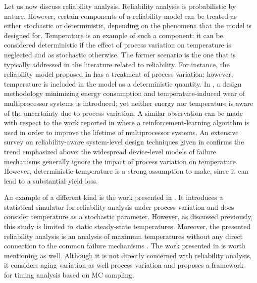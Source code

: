 Let us now discuss reliability analysis. Reliability analysis is probabilistic
by nature. However, certain components of a reliability model can be treated as
either stochastic or deterministic, depending on the phenomena that the model is
designed for. Temperature is an example of such a component: it can be
considered deterministic if the effect of process variation on temperature is
neglected and as stochastic otherwise. The former scenario is the one that is
typically addressed in the literature related to reliability. For instance, the
reliability model proposed in \cite{xiang2010} has a treatment of process
variation; however, temperature is included in the model as a deterministic
quantity. In \cite{das2014a}, a design methodology minimizing energy consumption
and temperature-induced wear of multiprocessor systems is introduced; yet
neither energy nor temperature is aware of the uncertainty due to process
variation. A similar observation can be made with respect to the work reported
in \cite{das2014c} where a reinforcement-learning algorithm is used in order to
improve the lifetime of multiprocessor systems. An extensive survey on
reliability-aware system-level design techniques given in \cite{das2014b}
confirms the trend emphasized above: the widespread device-level models of
failure mechanisms generally ignore the impact of process variation on
temperature. However, deterministic temperature is a strong assumption to make,
since it can lead to a substantial yield loss.

An example of a different kind is the work presented in \cite{lee2013}. It
introduces a statistical simulator for reliability analysis under process
variation and does consider temperature as a stochastic parameter. However, as
discussed previously, this study is limited to static steady-state temperatures.
Moreover, the presented reliability analysis is an analysis of maximum
temperatures without any direct connection to the common failure mechanisms
\cite{jedec2016}. The work presented in \cite{kiamehr2016} is worth mentioning
as well. Although it is not directly concerned with reliability analysis, it
considers aging variation as well process variation and proposes a framework for
timing analysis based on \ac{MC} sampling.

